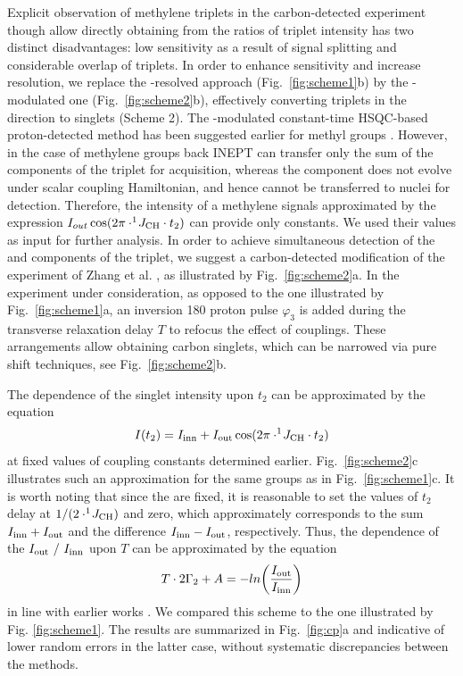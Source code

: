 \documentclass[twocolumn]{svjour3}           %
\begin{document}
Explicit observation of methylene triplets in the carbon-detected experiment 
though allow directly obtaining \gtwo{} from the ratios of triplet intensity 
has two distinct disadvantages: low sensitivity as a result of signal splitting and considerable overlap of triplets. 
In order to enhance sensitivity and increase resolution, we replace the 
\oneJch-resolved approach (Fig.~\ref{fig:scheme1}b) by the \oneJch-modulated 
one (Fig.~\ref{fig:scheme2}b), 
effectively converting triplets in the \clab{} direction to singlets 
(Scheme 2). The \oneJch-modulated constant-time {HSQC}-based proton-detected 
method has been sugges\-ted earlier for methyl groups \cite{zhang_probing_2006,lesovoy_nmr_2017}.
However, in the case of methylene groups back {INEPT} can transfer only the 
sum of the \qouter{} components \TermOuter{} of the \clab{} triplet for 
\hlab{} acquisition, whereas the \qinner{} component \TermInner{} does not 
evolve under \oneJch{} scalar coupling Hamiltonian, and hence cannot be 
transferred to \hlab{} nuclei for detection. Therefore, the intensity of a methylene signals approximated by the expression $I_{out} \cos (2 \pi \cdot ^1\!J_\text{CH} \cdot t_2) $ can provide only \oneJch{} constants. We used their values as input for 
further analysis. In order to achieve simultaneous detection of the 
\qinner{} and \qouter{} components of the \clab{} triplet, we suggest a 
carbon-detected modification of the experiment of Zhang et al. 
\cite{zhang_probing_2006}, as illustrated by Fig.~\ref{fig:scheme2}a. 
In the experiment under consideration, as opposed to the one illustrated 
by Fig.~\ref{fig:scheme1}a, an inversion 180\degree{} proton pulse 
$\varphi_3$ is added during the transverse relaxation delay $T$ to 
refocus the effect of \oneJch{} couplings. These arrangements allow 
obtaining carbon singlets, which can be narrowed via pure 
shift techniques, see Fig.~\ref{fig:scheme2}b. 

The dependence of the singlet intensity upon $t_2$ can be approximated by the 
equation
\begin{equation}
  \label{eq:sch2:time}
  I(t_2) = I_\textrm{inn} + I_\textrm{out} \cos (2\pi \cdot ^1\!J_\text{CH} \cdot t_2 ) 
\end{equation}
at fixed values of \oneJch{} coupling constants determined earlier. 
Fig.~\ref{fig:scheme2}c illustrates such an approximation for the same 
groups as in Fig.~\ref{fig:scheme1}c. 
It is worth noting that since the \oneJch{} are fixed, it is reasonable to 
set the values of $t_2$ delay at $1/(2 \cdot ^1\!J_\text{CH})$ and zero, which approximately 
corresponds to the sum $I_\textrm{inn} + I_\textrm{out}$ and the difference 
$I_\textrm{inn} - I_\textrm{out}$, respectively. Thus, the dependence of the $\Iout / \Iinn$ 
upon $T$ can be approximated by the equation 
\begin{equation}
  \label{eq:sch2:intensity}
  T \cdot 2 \Gamma_2 + A = -ln \biggl(\frac{I_\textrm{out}}{I_\textrm{inn}} \biggr) 
\end{equation}
in line with earlier works \cite{zhang_probing_2006,carlomagno_errors_2000}. 
We compared this scheme to the one illustrated by Fig. \ref{fig:scheme1}. 
The results are 
summarized in Fig.~\ref{fig:cp}a and indicative of lower random errors 
in the latter case, without systematic discrepancies between the methods. 
\end{document}

